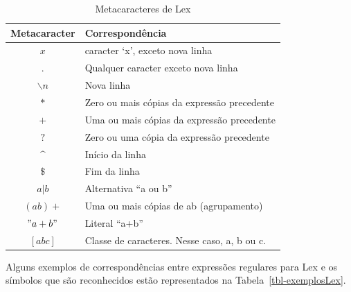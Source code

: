 \documentclass[
  brazilian,
  letterpaper,
]{book}
\theoremstyle{plain}
\theoremstyle{definition}
\theoremstyle{remark}
\begin{document}
\begin{longtable}[]{|c|l|}

\caption{\label{tbl-metacaracteres}Metacaracteres de Lex}

\tabularnewline

\toprule\noalign{}
\textbf{Metacaracter} & \textbf{Correspondência} \\
\midrule\noalign{}
\endhead
\bottomrule\noalign{}
\endlastfoot
\(x\) & caracter `x', exceto nova linha \\
\midrule
\(.\) & Qualquer caracter exceto nova linha \\
\midrule
\(\backslash n\) & Nova linha \\
\midrule
\(*\) & Zero ou mais cópias da expressão precedente \\
\midrule
\(+\) & Uma ou mais cópias da expressão precedente \\
\midrule
\(?\) & Zero ou uma cópia da expressão precedente \\
\midrule
\(\^\) & Início da linha \\
\midrule
\(\$\) & Fim da linha \\
\midrule
\(a|b\) & Alternativa ``a ou b'' \\
\midrule
\((ab)+\) & Uma ou mais cópias de ab (agrupamento) \\
\midrule
\("a+b"\) & Literal ``a+b'' \\
\midrule
\([abc]\) & Classe de caracteres. Nesse caso, a, b ou c. \\

\end{longtable}

Alguns exemplos de correspondências entre expressões regulares para Lex
e os símbolos que são reconhecidos estão representados na
Tabela~\ref{tbl-exemplosLex}.
\end{document}
